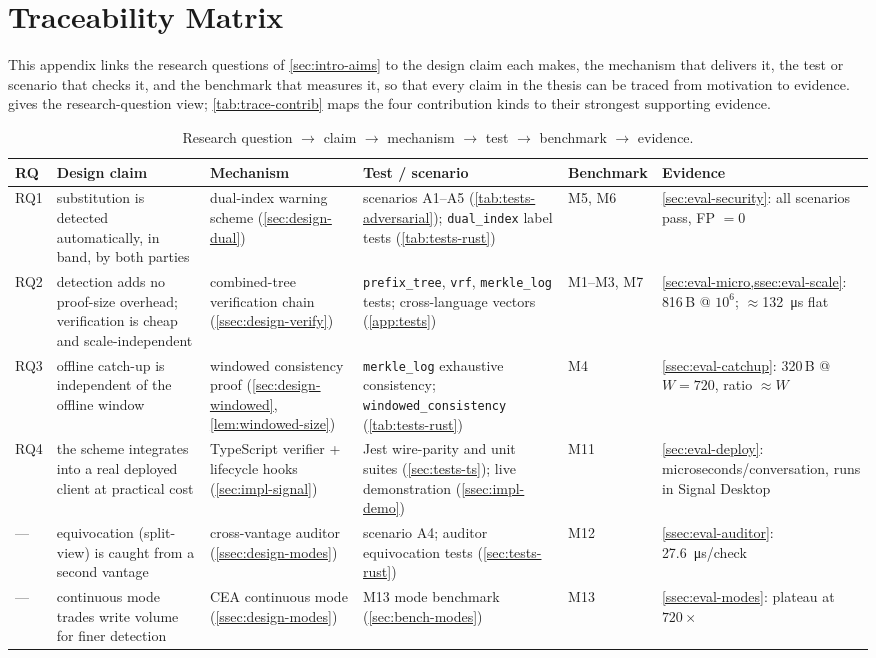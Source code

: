 \chapter{Traceability Matrix}\label{app:traceability}

This appendix links the research questions of \cref{sec:intro-aims} to the design claim each makes,
the mechanism that delivers it, the test or scenario that checks it, and the benchmark that measures
it, so that every claim in the thesis can be traced from motivation to evidence. 
gives the research-question view; \cref{tab:trace-contrib} maps the four contribution kinds to their
strongest supporting evidence.

\begin{table}[ht]
\centering
\caption{Research question $\to$ claim $\to$ mechanism $\to$ test $\to$ benchmark $\to$ evidence.}
\label{tab:trace-rq}
\footnotesize
\begin{tabular}{@{}p{0.7cm}p{2.9cm}p{2.5cm}p{3.0cm}p{1.6cm}p{2.0cm}@{}}
\toprule
RQ & Design claim & Mechanism & Test / scenario & Benchmark & Evidence \\
\midrule
RQ1 & substitution is detected automatically, in band, by both parties &
dual-index warning scheme (\cref{sec:design-dual}) &
scenarios A1--A5 (\cref{tab:tests-adversarial}); \texttt{dual\_index} label tests (\cref{tab:tests-rust}) &
M5, M6 & \cref{sec:eval-security}: all scenarios pass, FP $=0$ \\
RQ2 & detection adds no proof-size overhead; verification is cheap and scale-independent &
combined-tree verification chain (\cref{ssec:design-verify}) &
\texttt{prefix\_tree}, \texttt{vrf}, \texttt{merkle\_log} tests; cross-language vectors (\cref{app:tests}) &
M1--M3, M7 & \cref{sec:eval-micro,ssec:eval-scale}: 816\,B @ $10^6$; $\approx$\SI{132}{\micro\second} flat \\
RQ3 & offline catch-up is independent of the offline window &
windowed consistency proof (\cref{sec:design-windowed}, \cref{lem:windowed-size}) &
\texttt{merkle\_log} exhaustive consistency; \texttt{windowed\_consistency} (\cref{tab:tests-rust}) &
M4 & \cref{ssec:eval-catchup}: 320\,B @ $W{=}720$, ratio $\approx W$ \\
RQ4 & the scheme integrates into a real deployed client at practical cost &
TypeScript verifier + lifecycle hooks (\cref{sec:impl-signal}) &
Jest wire-parity and unit suites (\cref{sec:tests-ts}); live demonstration (\cref{ssec:impl-demo}) &
M11 & \cref{sec:eval-deploy}: microseconds/conversation, runs in Signal Desktop \\
\midrule
--- & equivocation (split-view) is caught from a second vantage &
cross-vantage auditor (\cref{ssec:design-modes}) &
scenario A4; auditor equivocation tests (\cref{sec:tests-rust}) &
M12 & \cref{ssec:eval-auditor}: \SI{27.6}{\micro\second}/check \\
--- & continuous mode trades write volume for finer detection &
CEA continuous mode (\cref{ssec:design-modes}) &
M13 mode benchmark (\cref{sec:bench-modes}) &
M13 & \cref{ssec:eval-modes}: plateau at $720\times$ \\
\bottomrule
\end{tabular}
\end{table}

